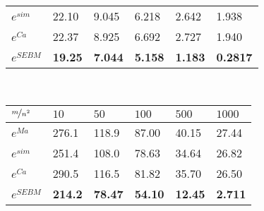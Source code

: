 \begin{table*}[]
\begin{minipage}[]{0.8\textwidth}
\begin{tabular}{llllll}
			$e^{sim}$   & 22.10 & 9.045 & 6.218 & 2.642 & 1.938 \\
			$e^{Ca}$    & 22.37 & 8.925 & 6.692 & 2.727 & 1.940 \\
			$e^{SEBM}$  & \textbf{19.25} & \textbf{7.044} & \textbf{5.158} & \textbf{1.183} & \textbf{0.2817}  \\
			\hline
			\end{tabular}
    \end{minipage}
	\\\vspace{4mm}
    \begin{minipage}[]{0.8\textwidth}
        \centering
        \caption{Complex Reward Division Game average errors}\label{tab4}
			\centering
			\begin{tabular}{llllll}
			\hline
			$\nicefrac{m}{n^2}$ & $10$ & $50$ & $100$ & $500$ & $1000$ \\
			\hline
			$e^{Ma}$   & 276.1 & 118.9 & 87.00 & 40.15 & 27.44 \\
			$e^{sim}$  & 251.4 & 108.0 & 78.63 & 34.64 & 26.82 \\
			$e^{Ca}$   & 290.5 & 116.5 & 81.82 & 35.70 & 26.50 \\
			$e^{SEBM}$ & \textbf{214.2} & \textbf{78.47} & \textbf{54.10} & \textbf{12.45} & \textbf{2.711}  \\
			\hline
			\end{tabular}
    \end{minipage}
    \vspace{3mm}
    \caption[Average errors approximating the Shapley Value across games and methods]{Average absolute errors in the Shapley Value calculation across all players in the four cooperative games (units in $10^{-4}$), for the different sampling schemes with different sampling budgets $m$ per number of strata (with $n^2=15^2$ for all). lowest error results are boldened.}
    \label{Table2}
\end{table*}
